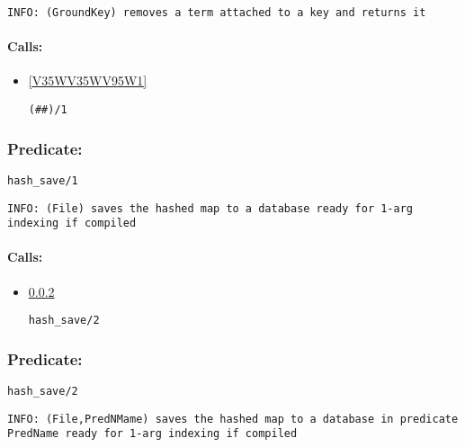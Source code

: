 {\small \begin{verbatim}
INFO: (GroundKey) removes a term attached to a key and returns it

\end{verbatim}}
\paragraph{Calls:} 
\begin{itemize}
\item \ref{V35WV35WV95W1} 
\begin{verbatim}
(##)/1
\end{verbatim}

\end{itemize}

\subsubsection{Predicate:} \label{hashV95WsaveV95W1}

\begin{verbatim}
hash_save/1
\end{verbatim}

{\small \begin{verbatim}
INFO: (File) saves the hashed map to a database ready for 1-arg indexing if compiled

\end{verbatim}}
\paragraph{Calls:} 
\begin{itemize}
\item \ref{hashV95WsaveV95W2} 
\begin{verbatim}
hash_save/2
\end{verbatim}

\end{itemize}

\subsubsection{Predicate:} \label{hashV95WsaveV95W2}

\begin{verbatim}
hash_save/2
\end{verbatim}

{\small \begin{verbatim}
INFO: (File,PredNMame) saves the hashed map to a database in predicate PredName ready for 1-arg indexing if compiled

\end{verbatim}}
